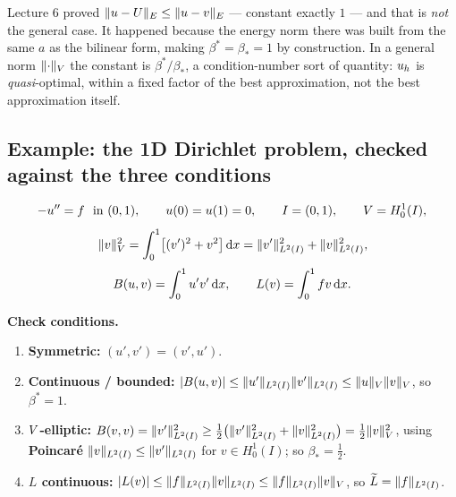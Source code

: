 \begin{pitfall}
Lecture 6 proved $\lVert u-U\rVert_{E}\le\lVert u-v\rVert_{E}$ --- constant exactly $1$ ---
and that is \emph{not} the general case. It happened because the energy norm
there was built from the same $a$ as the bilinear form, making
$\beta^{*}=\beta_{*}=1$ by construction. In a general norm
$\lVert\cdot\rVert_{V}$ the constant is $\beta^{*}/\beta_{*}$, a condition-number
sort of quantity: $u_{h}$ is \emph{quasi}-optimal, within a fixed factor of the
best approximation, not the best approximation itself.
\end{pitfall}

\subsection*{Example: the 1D Dirichlet problem, checked against the three conditions}

\begin{equation}\label{eq:l13ex1d}
  -u''=f \ \text{ in } (0,1),\qquad u(0)=u(1)=0,
  \qquad I=(0,1),\qquad V=H^{1}_{0}(I),
\end{equation}
\begin{equation}\label{eq:l13ex1dnorm}
  \lVert v\rVert^{2}_{V}=\int_{0}^{1}\bigl[(v')^{2}+v^{2}\bigr]\,\mathrm{d} x
   =\lVert v'\rVert^{2}_{L^{2}(I)}+\lVert v\rVert^{2}_{L^{2}(I)},
\end{equation}
\begin{equation}\label{eq:l13ex1dBL}
  B(u,v)=\int_{0}^{1}u'v'\,\mathrm{d} x,\qquad L(v)=\int_{0}^{1}fv\,\mathrm{d} x .
\end{equation}

\noindent
\textbf{Check conditions.}
\begin{enumerate}[label=\arabic*),leftmargin=2.2em,itemsep=3pt]
\item \textbf{Symmetric:} $(u',v')=(v',u')$. \cmark
\item \textbf{Continuous / bounded:}
  $|B(u,v)|\le\lVert u'\rVert_{L^{2}(I)}\lVert v'\rVert_{L^{2}(I)}
   \le\lVert u\rVert_{V}\lVert v\rVert_{V}$, so $\beta^{*}=1$. \cmark
\item \textbf{$V$-elliptic:}
  $B(v,v)=\lVert v'\rVert^{2}_{L^{2}(I)}
   \ge\tfrac12\bigl(\lVert v'\rVert^{2}_{L^{2}(I)}+\lVert v\rVert^{2}_{L^{2}(I)}\bigr)
   =\tfrac12\lVert v\rVert^{2}_{V}$, using \textbf{Poincar\'e}
  $\lVert v\rVert_{L^{2}(I)}\le\lVert v'\rVert_{L^{2}(I)}$ for $v\in H^{1}_{0}(I)$; so
  $\beta_{*}=\tfrac12$. \cmark
\item \textbf{$L$ continuous:}
  $|L(v)|\le\lVert f\rVert_{L^{2}(I)}\lVert v\rVert_{L^{2}(I)}
   \le\lVert f\rVert_{L^{2}(I)}\lVert v\rVert_{V}$, so
  $\widetilde{L}=\lVert f\rVert_{L^{2}(I)}$. \cmark
\end{enumerate}


